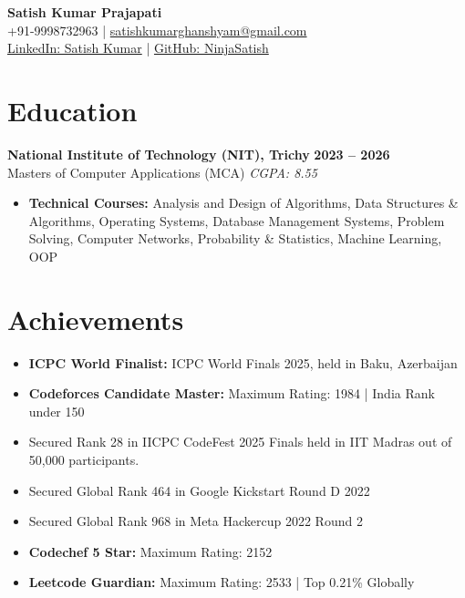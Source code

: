 \documentclass[10pt,a4paper]{article}
\begin{document}
\pagestyle{empty}

\begin{center}
    {\Huge \textbf{Satish Kumar Prajapati}} \\ \vspace{4pt}
    +91-9998732963 | \href{mailto:satishkumarghanshyam@gmail.com}{satishkumarghanshyam@gmail.com} \\ \vspace{2pt}
    \href{https://linkedin.com/in/Satish-Kumar}{LinkedIn: Satish Kumar} | \href{https://github.com/NinjaSatish}{GitHub: NinjaSatish}
\end{center}

\section*{Education}
\noindent
\textbf{National Institute of Technology (NIT), Trichy} \hfill \textbf{2023 -- 2026} \\
Masters of Computer Applications (MCA) \hfill \textit{CGPA: 8.55} \\
\vspace{-4pt}
\begin{itemize}[leftmargin=*, noitemsep]
    \item \textbf{Technical Courses:} Analysis and Design of Algorithms, Data Structures \& Algorithms, Operating Systems, Database Management Systems, Problem Solving, Computer Networks, Probability \& Statistics, Machine Learning, OOP
\end{itemize}

\section*{Achievements}
\begin{itemize}[leftmargin=*, noitemsep]
    \item \textbf{ICPC World Finalist:} ICPC World Finals 2025, held in Baku, Azerbaijan
    \item \textbf{Codeforces Candidate Master:} Maximum Rating: 1984 | India Rank under 150
    \item Secured Rank 28 in IICPC CodeFest 2025 Finals held in IIT Madras out of 50,000 participants.
    \item Secured Global Rank 464 in Google Kickstart Round D 2022
    \item Secured Global Rank 968 in Meta Hackercup 2022 Round 2
    \item \textbf{Codechef 5 Star:} Maximum Rating: 2152
    \item \textbf{Leetcode Guardian:} Maximum Rating: 2533 | Top 0.21\% Globally
\end{itemize}
\end{document}
